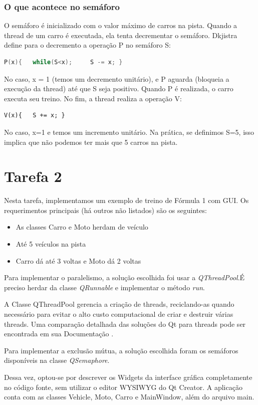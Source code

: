 \documentclass[12pt,a4paper]{article}
\begin{document}
\subsubsection*{O que acontece no semáforo}
O semáforo é inicializado com o valor máximo de carros na pista. Quando a thread de um carro é executada, ela tenta decrementar o semáforo.
Dkjistra define \cite{wikipedia-semaphore} para o decremento a operação P no semáforo S:
\begin{lstlisting}[language=C]
P(x){	while(S<x);		S -= x;	}
\end{lstlisting}
No caso, x = 1 (temos um decremento unitário), e P aguarda (bloqueia a execução da thread) até que S seja positivo.
Quando P é realizada, o carro executa seu treino. No fim, a thread realiza a operação V:
\begin{lstlisting}
V(x){	S += x;	}
\end{lstlisting}
No caso, x=1 e temos um incremento unitário.
Na prática, se definimos S=5, isso implica que não podemos ter mais que 5 carros na pista.
\section{Tarefa 2}
Nesta tarefa, implementamos um exemplo de treino de Fórmula 1 com GUI. Os requerimentos principais (há outros não listados) são os seguintes:
\begin{itemize}
\item As classes Carro e Moto herdam de veículo
\item Até 5 veículos na pista
\item Carro dá até 3 voltas e Moto dá 2 voltas
\end{itemize}
Para implementar o paralelismo, a solução escolhida foi usar a \emph{QThreadPool}.É preciso herdar da classe \emph{QRunnable} e implementar o método \emph{run}. 

A Classe QThreadPool gerencia a criação de threads, reciclando-as quando necessário para evitar o alto custo computacional de criar e destruir várias threads. Uma comparação detalhada das soluções do Qt para threads pode ser encontrada em sua Documentação \cite{qt_multithreading}.

Para implementar a exclusão mútua, a solução escolhida foram os semáforos disponíveis na classe \emph{QSemaphore}.

Dessa vez, optou-se por descrever os Widgets da interface gráfica completamente no código fonte, sem utilizar o editor WYSIWYG do Qt Creator.
A aplicação conta com as classes Vehicle, Moto, Carro e MainWindow, além do arquivo main.
\end{document}
